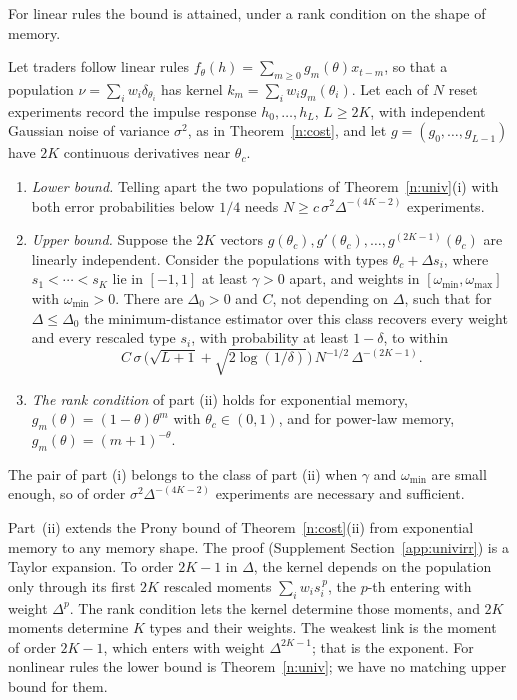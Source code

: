 For linear rules the bound is attained, under a rank condition on the shape of memory.

\begin{theorem}\label{n:shape}
Let traders follow linear rules $f_\theta(h)=\sum_{m\ge0}g_m(\theta)x_{t-m}$, so that a population $\nu=\sum_iw_i\delta_{\theta_i}$ has kernel $k_m=\sum_iw_ig_m(\theta_i)$. Let each of $N$ reset experiments record the impulse response $h_0,\ldots,h_L$, $L\ge2K$, with independent Gaussian noise of variance $\sigma^2$, as in Theorem~\ref{n:cost}, and let $g=(g_0,\ldots,g_{L-1})$ have $2K$ continuous derivatives near $\theta_c$.
\begin{enumerate}[label=(\roman*),itemsep=1pt]
\item \emph{Lower bound.} Telling apart the two populations of Theorem~\ref{n:univ}(i) with both error probabilities below $1/4$ needs $N\ge c\,\sigma^2\Delta^{-(4K-2)}$ experiments.
\item \emph{Upper bound.} Suppose the $2K$ vectors $g(\theta_c),g'(\theta_c),\ldots,g^{(2K-1)}(\theta_c)$ are linearly independent. Consider the populations with types $\theta_c+\Delta s_i$, where $s_1<\cdots<s_K$ lie in $[-1,1]$ at least $\gamma>0$ apart, and weights in $[\omega_{\min},\omega_{\max}]$ with $\omega_{\min}>0$. There are $\Delta_0>0$ and $C$, not depending on $\Delta$, such that for $\Delta\le\Delta_0$ the minimum-distance estimator over this class recovers every weight and every rescaled type $s_i$, with probability at least $1-\delta$, to within
\[
C\,\sigma\,\big(\sqrt{L+1}+\sqrt{2\log(1/\delta)}\big)\,N^{-1/2}\,\Delta^{-(2K-1)}.
\]
\item \emph{The rank condition} of part (ii) holds for exponential memory, $g_m(\theta)=(1-\theta)\theta^m$ with $\theta_c\in(0,1)$, and for power-law memory, $g_m(\theta)=(m+1)^{-\theta}$.
\end{enumerate}
The pair of part (i) belongs to the class of part (ii) when $\gamma$ and $\omega_{\min}$ are small enough, so of order $\sigma^2\Delta^{-(4K-2)}$ experiments are necessary and sufficient.
\end{theorem}

Part~(ii) extends the Prony bound of Theorem~\ref{n:cost}(ii) from exponential memory to any memory shape. The proof (Supplement Section~\ref{app:univirr}) is a Taylor expansion. To order $2K-1$ in $\Delta$, the kernel depends on the population only through its first $2K$ rescaled moments $\sum_iw_is_i^{\,p}$, the $p$-th entering with weight $\Delta^p$. The rank condition lets the kernel determine those moments, and $2K$ moments determine $K$ types and their weights. The weakest link is the moment of order $2K-1$, which enters with weight $\Delta^{2K-1}$; that is the exponent. For nonlinear rules the lower bound is Theorem~\ref{n:univ}; we have no matching upper bound for them.

